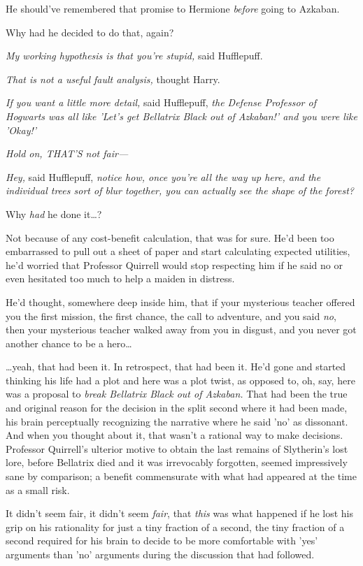 He should've remembered that promise to Hermione \emph{before} going to Azkaban.

Why had he decided to do that, again?

\emph{My working hypothesis is that you're stupid,} said Hufflepuff.

\emph{That is not a useful fault analysis,} thought Harry.

\emph{If you want a little more detail,} said Hufflepuff, \emph{the Defense 
Professor of Hogwarts was all like 'Let's get Bellatrix Black out of Azkaban!' 
and you were like 'Okay!'}

\emph{Hold on, THAT'S not fair---}

\emph{Hey,} said Hufflepuff, \emph{notice how, once you're all the way up here, 
and the individual trees sort of blur together, you can actually see the shape 
of the forest?}

Why \emph{had} he done it{\ldots}?

Not because of any cost-benefit calculation, that was for sure. He'd been too 
embarrassed to pull out a sheet of paper and start calculating expected 
utilities, he'd worried that Professor Quirrell would stop respecting him if he 
said no or even hesitated too much to help a maiden in distress.

He'd thought, somewhere deep inside him, that if your mysterious teacher 
offered you the first mission, the first chance, the call to adventure, and you 
said\emph{ no}, then your mysterious teacher walked away from you in disgust, 
and you never got another chance to be a hero{\ldots}

{\ldots}yeah, that had been it. In retrospect, that had been it. He'd gone and 
started thinking his life had a plot and here was a plot twist, as opposed to, 
oh, say, here was a proposal to \emph{break Bellatrix Black out of Azkaban.} 
That had been the true and original reason for the decision in the split second 
where it had been made, his brain perceptually recognizing the narrative where 
he said 'no' as dissonant. And when you thought about it, that wasn't a 
rational way to make decisions. Professor Quirrell's ulterior motive to obtain 
the last remains of Slytherin's lost lore, before Bellatrix died and it was 
irrevocably forgotten, seemed impressively sane by comparison; a benefit 
commensurate with what had appeared at the time as a small risk.

It didn't seem fair, it didn't seem \emph{fair}, that \emph{this} was what 
happened if he lost his grip on his rationality for just a tiny fraction of a 
second, the tiny fraction of a second required for his brain to decide to be 
more comfortable with 'yes' arguments than 'no' arguments during the discussion 
that had followed.

